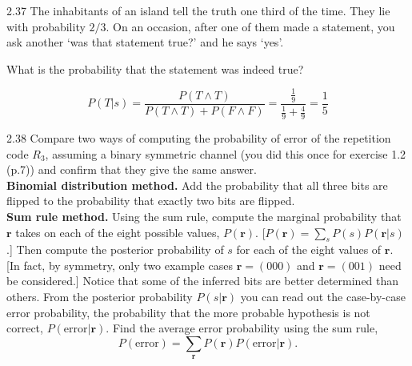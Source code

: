 \documentclass[12pt, a4paper]{article}
\begin{document}
\begin{prob}{2.37}
    The inhabitants of an island tell the truth one third of the time. They lie with probability $2/3$.
On an occasion, after one of them made a statement, you ask another `was that statement true?' and he says `yes'.
    
    What is the probability that the statement was indeed true?
\end{prob}
\begin{sol}
    $$P(T|s) = \frac{P(T \land T)}{P(T \land T) + P(F \land F)} = \frac{\frac{1}{9}}{\frac{1}{9} + \frac{4}{9}} = \frac{1}{5}$$
\end{sol}
\bigskip

\begin{prob}{2.38}
    Compare two ways of computing the probability of error of the repetition code $R_3$, assuming a binary symmetric channel (you did this once for exercise 1.2 (p.7)) and confirm that they give the same answer. \\

\textbf{Binomial distribution method.} Add the probability that all three bits are flipped to the probability that exactly two bits are flipped.\\
    
    \textbf{Sum rule method.} Using the sum rule, compute the marginal probability that $\mathbf{r}$ takes on each of the eight possible values, $P(\mathbf{r})$. [$P(\mathbf{r}) = \sum_s P(s)P(\mathbf{r}|s)$.] Then compute the posterior probability of $s$ for each of the eight values of $\mathbf{r}$. [In fact, by symmetry, only two example cases $\mathbf{r} = (000)$ and $\mathbf{r} = (001)$ need be considered.] Notice that some of the inferred bits are better determined than others. From the posterior probability $P(s|\mathbf{r})$ you can read out the case-by-case error probability, the probability that the more probable hypothesis is not correct, $P(\text{error}|\mathbf{r})$. Find the average error probability using the sum rule,
    \begin{equation}
        P(\text{error}) = \sum_{\mathbf{r}} P(\mathbf{r})P(\text{error}|\mathbf{r}). \tag{2.55}
    \end{equation}
\end{prob}
\end{document}
